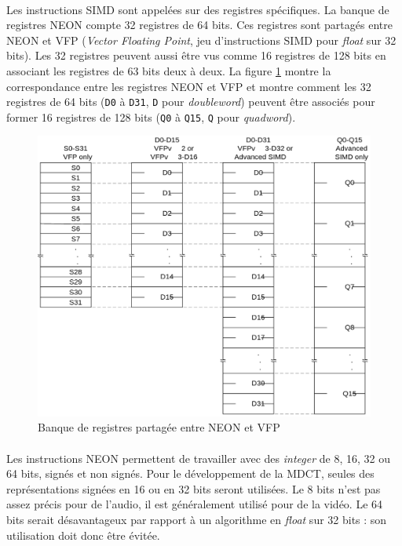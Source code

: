 \documentclass{article}
\begin{document}
    \paragraph{}
    Les instructions SIMD sont appelées sur des registres spécifiques. La banque de registres NEON compte 32 registres de 64 bits. Ces registres sont partagés entre NEON et VFP (\emph{Vector Floating Point}, jeu d'instructions SIMD pour \emph{float} sur 32 bits). Les 32 registres peuvent aussi être vus comme 16 registres de 128 bits en associant les registres de 63 bits deux à deux\cite{DOC-ARM}. La figure \ref{fig:neon-registers} montre la correspondance entre les registres NEON et VFP et montre comment les 32 registres de 64 bits (\texttt{D0} à \texttt{D31}, \texttt{D} pour \emph{doubleword}) peuvent être associés pour former 16 registres de 128 bits (\texttt{Q0} à \texttt{Q15}, \texttt{Q} pour \emph{quadword}).

    \begin{figure}[H]
        \centering
        \includegraphics[width=.6\linewidth]{./images/neon-registers.png}
        \caption{Banque de registres partagée entre NEON et VFP}
        \label{fig:neon-registers}
    \end{figure}

    \paragraph{}
    Les instructions NEON permettent de travailler avec des \emph{integer} de 8, 16, 32 ou 64 bits, signés et non signés. Pour le développement de la MDCT, seules des représentations signées en 16 ou en 32 bits seront utilisées. Le 8 bits n'est pas assez précis pour de l'audio, il est généralement utilisé pour de la vidéo. Le 64 bits serait désavantageux par rapport à un algorithme en \emph{float} sur 32 bits : son utilisation doit donc être évitée.
\end{document}

